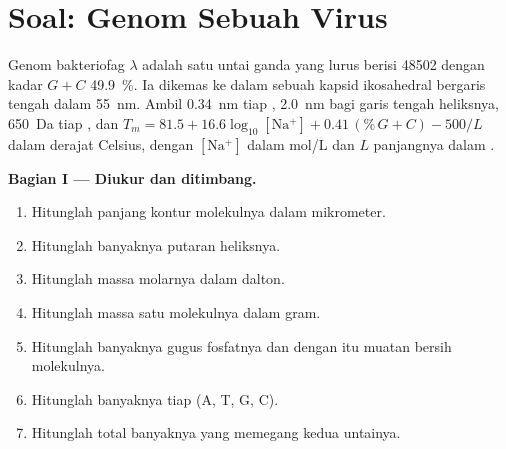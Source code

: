 \section{Soal: Genom Sebuah Virus}

\begin{problem}
\label{pb:b1:nucleic-acids:1}
Genom bakteriofag $\lambda$ adalah satu  untai ganda yang lurus
berisi \num{48502}  dengan kadar $G + C$ \qty{49.9}{\%}.
Ia dikemas ke dalam sebuah kapsid ikosahedral bergaris tengah dalam
\qty{55}{nm}. Ambil \qty{0.34}{nm} tiap , \qty{2.0}{nm}
bagi garis tengah heliksnya, \qty{650}{Da} tiap , dan
$T_m = 81.5 + 16.6\log_{10}[\mathrm{Na^+}]
+ 0.41\,(\%\,G{+}C) - 500/L$ dalam derajat Celsius, dengan
$[\mathrm{Na^+}]$
dalam \unit{mol/L} dan $L$ panjangnya dalam .

\medskip
\noindent\textbf{Bagian I --- Diukur dan ditimbang.}
\begin{enumerate}
  \item Hitunglah panjang kontur molekulnya dalam mikrometer.
  \item Hitunglah banyaknya putaran heliksnya.
  \item Hitunglah massa molarnya dalam dalton.
  \item Hitunglah massa satu molekulnya dalam gram.
  \item Hitunglah banyaknya gugus fosfatnya dan dengan itu muatan bersih
        molekulnya.
  \item Hitunglah banyaknya  tiap  (A, T, G, C).
  \item Hitunglah total banyaknya  yang memegang kedua
        untainya.
\end{enumerate}


\end{problem}
